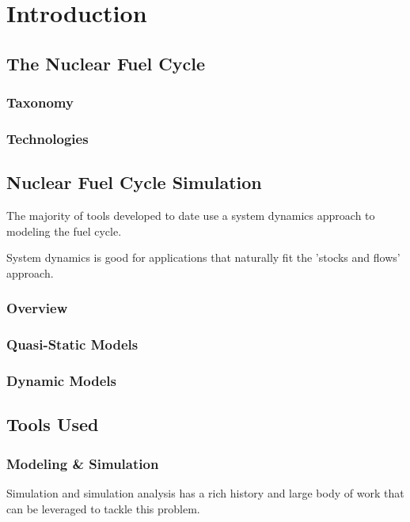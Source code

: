 \chapter{Introduction}\label{ch:intro}

\section{The Nuclear Fuel Cycle}

\subsection{Taxonomy}

\subsection{Technologies}

\section{Nuclear Fuel Cycle Simulation}

The majority of tools developed to date use a system dynamics approach to
modeling the fuel cycle.

System dynamics is good for applications that naturally fit the 'stocks and
flows' approach.

\subsection{Overview}

\subsection{Quasi-Static Models}

\subsection{Dynamic Models}

\section{Tools Used}

\subsection{Modeling \& Simulation}

Simulation and simulation analysis has a rich history and large body of work
that can be leveraged to tackle this problem.

